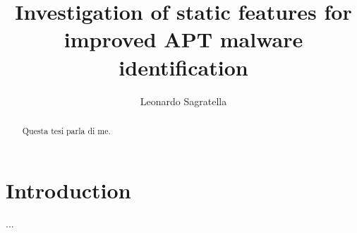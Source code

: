 \documentclass[binding=0.6cm,LaM,oneside]{sapthesis} %
\title{Investigation of static features for improved APT malware identification}
\author{Leonardo Sagratella}
\begin{document}
	\frontmatter
	\maketitle
	\dedication{Dedicato a\\ me stesso una stelle nascente e molto simpatica\\
	 ma soprattutto alla mia stella e luce, FEDERICO DI MAIO, figlio di GIGGINO DI MAIO nostro premier nonchè padre fondatore del reddito di cittadinanza}
	\begin{abstract}
		Questa tesi parla di me.
	\end{abstract}
	\tableofcontents
	\mainmatter
	\chapter{Introduction}
	
	
	
	
	
	
	
	...
	\backmatter
	\cleardoublepage
	
	
	
	
\end{document}
